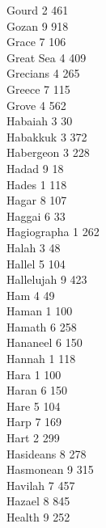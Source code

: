 Gourd \hfill 2 \quad \phantom{0}461\\
Gozan \hfill 9 \quad \phantom{0}918\\
Grace \hfill 7 \quad \phantom{0}106\\
Great Sea \hfill 4 \quad \phantom{0}409\\
Grecians \hfill 4 \quad \phantom{0}265\\
Greece \hfill 7 \quad \phantom{0}115\\
Grove \hfill 4 \quad \phantom{0}562\\
Habaiah \hfill 3 \quad \phantom{0}\phantom{0}30\\
Habakkuk \hfill 3 \quad \phantom{0}372\\
Habergeon \hfill 3 \quad \phantom{0}228\\
Hadad \hfill 9 \quad \phantom{0}\phantom{0}18\\
Hades \hfill 1 \quad \phantom{0}118\\
Hagar \hfill 8 \quad \phantom{0}107\\
Haggai \hfill 6 \quad \phantom{0}\phantom{0}33\\
Hagiographa \hfill 1 \quad \phantom{0}262\\
Halah \hfill 3 \quad \phantom{0}\phantom{0}48\\
Hallel \hfill 5 \quad \phantom{0}104\\
Hallelujah \hfill 9 \quad \phantom{0}423\\
Ham \hfill 4 \quad \phantom{0}\phantom{0}49\\
Haman \hfill 1 \quad \phantom{0}100\\
Hamath \hfill 6 \quad \phantom{0}258\\
Hananeel \hfill 6 \quad \phantom{0}150\\
Hannah \hfill 1 \quad \phantom{0}118\\
Hara \hfill 1 \quad \phantom{0}100\\
Haran \hfill 6 \quad \phantom{0}150\\
Hare \hfill 5 \quad \phantom{0}104\\
Harp \hfill 7 \quad \phantom{0}169\\
Hart \hfill 2 \quad \phantom{0}299\\
Hasideans \hfill 8 \quad \phantom{0}278\\
Hasmonean \hfill 9 \quad \phantom{0}315\\
Havilah \hfill 7 \quad \phantom{0}457\\
Hazael \hfill 8 \quad \phantom{0}845\\
Health \hfill 9 \quad \phantom{0}252\\
